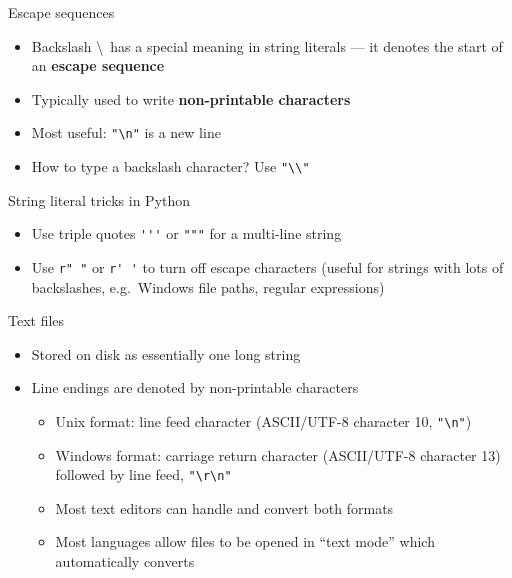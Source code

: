 \begin{frame}[fragile]{Escape sequences}
    \begin{itemize}
        \pause\item Backslash \textbackslash\ has a special meaning in string literals
            --- it denotes the start of an \textbf{escape sequence}
        \pause\item Typically used to write \textbf{non-printable characters}
        \pause\item Most useful: \lstinline{"\n"} is a new line
        \pause\item How to type a backslash character? Use \lstinline{"\\"}
    \end{itemize}
\end{frame}

\begin{frame}{String literal tricks in Python}
    \begin{itemize}
        \pause\item Use triple quotes \lstinline{'''} or \lstinline{"""} for a multi-line string
        \pause\item Use \lstinline{r" "} or \lstinline{r' '} to turn off escape characters
            (useful for strings with lots of backslashes, e.g.\ Windows file paths, regular expressions)
    \end{itemize}
\end{frame}

\begin{frame}[fragile]{Text files}
    \begin{itemize}
        \pause\item Stored on disk as essentially one long string
        \pause\item Line endings are denoted by non-printable characters
            \begin{itemize}
                \pause\item Unix format: line feed character (ASCII/UTF-8 character 10, \lstinline{"\n"})
                \pause\item Windows format: carriage return character (ASCII/UTF-8 character 13) followed by line feed, \lstinline{"\r\n"}
                \pause\item Most text editors can handle and convert both formats
                \pause\item Most languages allow files to be opened in ``text mode'' which automatically converts
            \end{itemize}
    \end{itemize}
\end{frame}

